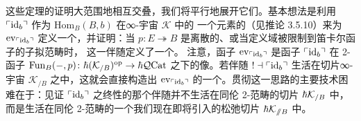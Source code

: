 这些定理的证明大范围地相互交叠，我们将平行地展开它们。基本想法是利用
$\ulcorner\mathrm{id}_{b}\urcorner$ 作为 $\mathrm{Hom}_{B}(B,b)$ 在∞-宇宙 $\mathcal{K}$ 中的
一个\trTerminal{}元素的\trUniversalProperty（见推论 3.5.10）来为
$\mathrm{ev}_{\ulcorner\mathrm{id}_{b}\urcorner}$ 定义一个\trRightAdjoint，并证明：当
$p\colon E\twoheadrightarrow B$ 是离散的、或当定义域被限制到笛卡尔函子的子拟范畴时，
这一伴随定义了一个\trAdjointEquivalence。
注意，函子 $\mathrm{ev}_{\ulcorner\mathrm{id}_{b}\urcorner}$ 是函子 $\ulcorner\mathrm{id}_{b}\urcorner$
在 2-函子 $\mathrm{Fun}_{B}(-,p)\colon\hbar(\mathcal{K}_{/B})^{\mathrm{op}}\to\hbar\mathcal{Q}\mathrm{Cat}$
之下的像。若伴随 $!\dashv\ulcorner\mathrm{id}_{b}\urcorner$ 生活在切片∞-宇宙
$\mathcal{K}_{/B}$ 之中，这就会直接构造出 $\mathrm{ev}_{\ulcorner\mathrm{id}_{b}\urcorner}$
的一个\trRightAdjoint。贯彻这一思路的主要技术困难在于：见证
$\ulcorner\mathrm{id}_{b}\urcorner$ 之终性的那个伴随并不生活在同伦 2-范畴的切片
$\hbar\mathcal{K}_{/B}$ 中，而是生活在同伦 2-范畴的一个我们现在即将引入的松弛切片
$\hbar\mathcal{K}_{/\!\!/B}$ 中。

